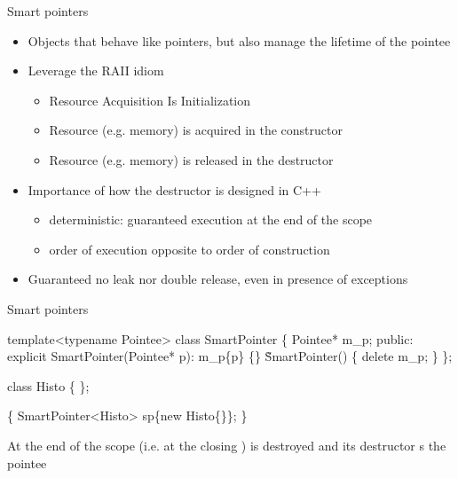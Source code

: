 \begin{frame}{Smart pointers}
  \begin{itemize}[<+->]
  \item Objects that behave like pointers, but also manage the lifetime of the pointee
  \item Leverage the RAII idiom
    \begin{itemize}[<.->]
    \item Resource Acquisition Is Initialization
    \item Resource (e.g. memory) is acquired in the constructor
    \item Resource (e.g. memory) is released in the destructor
    \end{itemize}
  \item Importance of how the destructor is designed in C++
    \begin{itemize}[<.->]
    \item deterministic: guaranteed execution at the end of the scope
    \item order of execution opposite to order of construction
    \end{itemize}
  \item Guaranteed no leak nor double release, even in presence of exceptions
  \end{itemize}
\end{frame}

\begin{frame}[fragile]{Smart pointers \insertcontinuationtext}
  \begin{codeblock}
template<typename Pointee>
class SmartPointer \{
  Pointee* m\_p;
 public:
  explicit SmartPointer(Pointee* p): m\_p\{p\} \{\}
  \~SmartPointer() \{ delete m\_p; \}
\};

class Histo \{ \ddd \};

\{
  SmartPointer<Histo> sp\{new Histo\{\}\};
\}\end{codeblock}

At the end of the scope (i.e. at the closing \code{\}})  is destroyed
and its destructor s the pointee

\end{frame}

